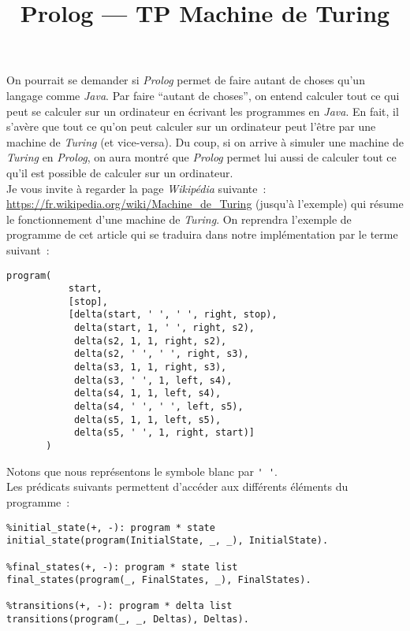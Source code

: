 \documentclass[a4paper]{article}
\title{Prolog --- TP Machine de Turing}
\begin{document}
\maketitle

\renewcommand{\labelitemi}{$\bullet$}
\renewcommand{\labelitemii}{$\star$}

On pourrait se demander si \emph{Prolog} permet de faire autant de choses qu'un langage comme \emph{Java}. Par faire ``autant de choses'', on entend
calculer tout ce qui peut se calculer sur un ordinateur en écrivant les programmes en \emph{Java}. En fait, il s'avère que tout ce qu'on peut calculer
sur un ordinateur peut l'être par une machine de \emph{Turing} (et vice-versa). Du coup, si on arrive à simuler une machine de \emph{Turing} en \emph{Prolog},
on aura montré que \emph{Prolog} permet lui aussi de calculer tout ce qu'il est possible de calculer sur un ordinateur.\\

Je vous invite à regarder la page \emph{Wikipédia} suivante~: \url{https://fr.wikipedia.org/wiki/Machine_de_Turing} (jusqu'à l'exemple) 
qui résume le fonctionnement d'une machine de \emph{Turing}. On reprendra l'exemple de programme de cet article qui se traduira dans notre implémentation par le
terme suivant~:
\begin{verbatim}
program(
           start, 
           [stop], 
           [delta(start, ' ', ' ', right, stop),
            delta(start, 1, ' ', right, s2),
            delta(s2, 1, 1, right, s2),
            delta(s2, ' ', ' ', right, s3),
            delta(s3, 1, 1, right, s3),
            delta(s3, ' ', 1, left, s4),
            delta(s4, 1, 1, left, s4),
            delta(s4, ' ', ' ', left, s5),
            delta(s5, 1, 1, left, s5),
            delta(s5, ' ', 1, right, start)]
       )
\end{verbatim}

Notons que nous représentons le symbole blanc par \verb+' '+.\\

Les prédicats suivants permettent d'accéder aux différents éléments du programme~:
\begin{verbatim}
%initial_state(+, -): program * state
initial_state(program(InitialState, _, _), InitialState).

%final_states(+, -): program * state list
final_states(program(_, FinalStates, _), FinalStates).

%transitions(+, -): program * delta list
transitions(program(_, _, Deltas), Deltas).
\end{verbatim}
\end{document}
